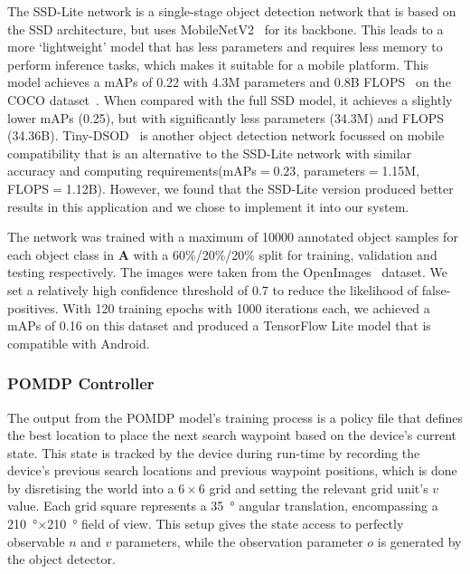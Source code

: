 \documentclass[runningheads]{llncs}
\newcommand\todo[1]{\textcolor{red}{#1}}
\begin{document}
The SSD-Lite network is a single-stage object detection network that is based on the SSD architecture, but uses MobileNetV2~\cite{sandler2018mobilenetv2} for its backbone.
This leads to a more `lightweight' model that has less parameters and requires less memory to perform inference tasks, which makes it suitable for a mobile platform. 
This model achieves a mAPs of 0.22 with 4.3M parameters and 0.8B FLOPS~\cite{li2018tinydsod} on the COCO dataset~\cite{lin2014microsoft}. 
When compared with the full SSD model, it achieves a slightly lower mAPs (0.25), but with significantly less parameters (34.3M) and FLOPS (34.36B).
Tiny-DSOD~\cite{li2018tinydsod} is another object detection network focussed on mobile compatibility that is an alternative to the SSD-Lite network with similar accuracy and computing requirements(mAPs$=0.23$, parameters$=$1.15M, FLOPS$=$1.12B).
However, we found that the SSD-Lite version produced better results in this application and we chose to implement it into our system.

The network was trained with a maximum of 10000 annotated object samples for each object class in $\mathbf{A}$ with a 60\%/20\%/20\% split for training, validation and testing respectively.
The images were taken from the OpenImages~\cite{openimages} dataset.
We set a relatively high confidence threshold of 0.7 to reduce the likelihood of false-positives.
With 120 training epochs with 1000 iterations each, we achieved a mAPs of 0.16 on this dataset and produced a TensorFlow Lite model that is compatible with Android. 

\subsubsection{POMDP Controller}

The output from the POMDP model's training process is a policy file that defines the best location to place the next search waypoint based on the device's current state.
This state is tracked by the device during run-time by recording the device's previous search locations and previous waypoint positions, which is done by disretising the world into a $6\times6$ grid and setting the relevant grid unit's $v$ value.
Each grid square represents a \SI{35}{\degree} angular translation, encompassing a \SI{210}{\degree}$\times$\SI{210}{\degree} field of view. 
This setup gives the state access to perfectly observable $n$ and $v$ parameters, while the observation parameter $o$ is generated by the object detector. 
\end{document}
